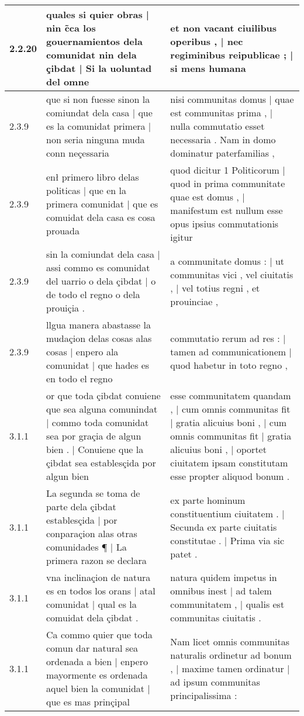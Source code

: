 \begin{tabular}{|p{1cm}|p{6.5cm}|p{6.5cm}|}
2.2.20 & quales si quier obras | nin c̃ca los gouernamientos dela comunidat nin dela çibdat | Si la uoluntad del omne & et non vacant ciuilibus operibus , | nec regiminibus reipublicae ; | si mens humana \\\hline
2.3.9 & que si non fuesse sinon la comiundat dela casa | que es la comunidat primera | non seria ninguna muda conn neçessaria & nisi communitas domus | quae est communitas prima , | nulla commutatio esset necessaria . Nam in domo dominatur paterfamilias , \\\hline
2.3.9 & enł primero libro delas politicas | que en la primera comunidat | que es comuidat dela casa es cosa prouada & quod dicitur 1 Politicorum | quod in prima communitate quae est domus , | manifestum est nullum esse opus ipsius commutationis igitur \\\hline
2.3.9 & sin la comiundat dela casa | assi commo es comunidat del uarrio o dela çibdat | o de todo el regno o dela prouiçia . & a communitate domus : | ut communitas vici , vel ciuitatis , | vel totius regni , et prouinciae , \\\hline
2.3.9 & llgua manera abastasse la mudaçion delas cosas alas cosas | enpero ala comunidat | que hades es en todo el regno & commutatio rerum ad res : | tamen ad communicationem | quod habetur in toto regno , \\\hline
3.1.1 & or que toda çibdat conuiene que sea alguna comunindat | commo toda comunidat sea por graçia de algun bien . | Conuiene que la çibdat sea establesçida por algun bien & esse communitatem quandam , | cum omnis communitas fit | gratia alicuius boni , | cum omnis communitas fit | gratia alicuius boni , | oportet ciuitatem ipsam constitutam esse propter aliquod bonum . \\\hline
3.1.1 & La segunda se toma de parte dela çibdat establesçida | por conparaçion alas otras comunidades ¶ | La primera razon se declara & ex parte hominum constituentium ciuitatem . | Secunda ex parte ciuitatis constitutae . | Prima via sic patet . \\\hline
3.1.1 & vna inclinaçion de natura es en todos los orans | atal comunidat | qual es la comuidat dela çibdat . & natura quidem impetus in omnibus inest | ad talem communitatem , | qualis est communitas ciuitatis . \\\hline
3.1.1 & Ca commo quier que toda comun dar natural sea ordenada a bien | enpero mayormente es ordenada aquel bien la comunidat | que es mas prinçipal & Nam licet omnis communitas naturalis ordinetur ad bonum , | maxime tamen ordinatur | ad ipsum communitas principalissima : \\\hline

\end{tabular}

